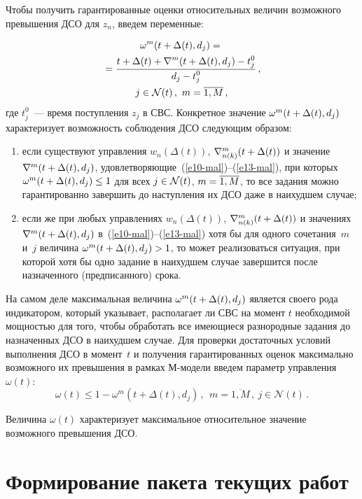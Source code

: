 \begin{multicols}{2}
Чтобы получить гарантированные оценки относительных величин возможного превышения  ДСО для $z_n$,   введем переменные:

\noindent
\begin{multline}
\omega^m(t + \Delta(t) , d_j) = {}\\
{} = \fr{t + \Delta(t) +  \nabla^{m}(t +  \Delta(t), d_j) - t^0_j}{d_j -  t_j^0 }\,, \\ 
j \in \mathcal{N}(t)\,, \ 
m = \overline {1,M}\,,
\label{e13-mal}
\end{multline}
где $ t_j^0$~--- время поступления $z_j$ в СВС.  Конкретное значение $\omega^m(t \hm+ \Delta(t), d_j)$  
характеризует возможность соблюдения ДСО следующим образом:
\begin{enumerate}[(1)]
\item если существуют управления $w_n( \Delta(t))$, $\nabla _{n(k)}^m (t \hm+ \Delta(t))$ и 
значение $\nabla ^m (t \hm+ \Delta(t), d_j)$, удовле\-тво\-ря\-ющие~(\ref{e10-mal})--(\ref{e13-mal}), 
при которых  $\omega^m (t \hm+ \Delta(t), d_j) \hm\le 1$ для всех 
$j \hm\in \mathcal{N} (t)$, $m\hm = \overline {1, M}$,
то все задания можно гарантированно завершить до наступления их ДСО даже в наихудшем случае;

\item если же при любых управлениях $w_n(\Delta(t))$, $\nabla _{n(k)}^m (t \hm+ \Delta(t))$ и значениях 
$\nabla^m (t \hm+ \Delta(t), d_j)$ в~(\ref{e10-mal})--(\ref{e13-mal})  хотя бы для одного сочетания~$m$  и~$j$ величина 
$\omega^m (t \hm+ \Delta(t), d_j) \hm> 1$, то   может реализоваться ситуация,  при которой хотя бы одно задание 
в наихудшем случае завершится после назначенного (предписанного) срока.
\end{enumerate}

На самом деле максимальная величина $\omega^m (t \hm+ \Delta(t), d_j)$ является своего рода индикатором, 
который указывает, располагает ли  СВС на момент  $t$  необходимой мощностью для того, чтобы обработать 
все имеющиеся разнородные задания до назначенных ДСО в наихудшем случае.
Для проверки достаточных условий выполнения ДСО в момент~$t$ и получения 
гарантированных оценок максимально  возможного их превышения в рамках М-модели введем параметр управления  $ \omega(t)$:
$$
\omega (t) \le 1 -  \omega^m(t + \Delta(t), d_j)\,, \ \ m = \overline {1, M}\,,\ j \in \mathcal{N}(t)\,. 
$$

Величина $\omega (t)$ характеризует максимальное относительное значение возможного превышения ДСО.

\section{Формирование  пакета  текущих работ}


\end{multicols}
